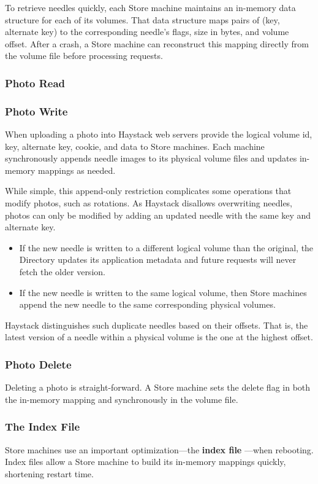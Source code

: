 \documentclass[11pt]{article}
\begin{document}
To retrieve needles quickly, each Store machine maintains an in-memory data structure for each of its
volumes. That data structure maps pairs of (key, alternate key) to the corresponding needle’s flags,
size in bytes, and volume offset. After a crash, a Store machine can reconstruct this mapping directly
from the volume file before processing requests.
\subsubsection{Photo Read}
\label{sec:orgbe22af3}
\subsubsection{Photo Write}
\label{sec:org8f3069e}
When uploading a photo into Haystack web servers provide the logical volume id, key, alternate key,
cookie, and data to Store machines. Each machine synchronously appends needle images to its physical
volume files and updates in-memory mappings as needed.

While simple, this append-only restriction complicates some operations that modify photos, such as
rotations. As Haystack disallows overwriting needles, photos can only be modified by adding an updated
needle with the same key and alternate key.
\begin{itemize}
\item If the new needle is written to a different logical volume than the original, the Directory updates
its application metadata and future requests will never fetch the older version.
\item If the new needle is written to the same logical volume, then Store machines append the new needle
to the same corresponding physical volumes.
\end{itemize}

Haystack distinguishes such duplicate needles based on their offsets. That is, the latest version of a
needle within a physical volume is the one at the highest offset.
\subsubsection{Photo Delete}
\label{sec:org19735d8}
Deleting a photo is straight-forward. A Store machine sets the delete flag in both the in-memory
mapping and synchronously in the volume file.
\subsubsection{The Index File}
\label{sec:org3148868}
Store machines use an important optimization—the \textbf{index file} —when rebooting.
Index files allow a Store machine to build its in-memory mappings quickly, shortening restart time.
\end{document}
